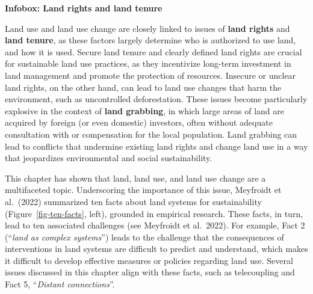 \documentclass[
  a4paper,
  openany]{book}
\begin{document}
\begin{tcolorbox}[enhanced jigsaw, left=2mm, arc=.35mm, titlerule=0mm, opacityback=0, leftrule=.75mm, title={Note}, breakable, bottomtitle=1mm, rightrule=.15mm, coltitle=black, toptitle=1mm, bottomrule=.15mm, colback=white, opacitybacktitle=0.6, colbacktitle=quarto-callout-note-color!10!white, toprule=.15mm, colframe=quarto-callout-note-color-frame]

\textbf{Infobox: Land rights and land tenure}

Land use and land use change are closely linked to issues of
\textbf{land rights} and \textbf{land tenure}, as these factors largely
determine who is authorized to use land, and how it is used. Secure land
tenure and clearly defined land rights are crucial for sustainable land
use practices, as they incentivize long-term investment in land
management and promote the protection of resources. Insecure or unclear
land rights, on the other hand, can lead to land use changes that harm
the environment, such as uncontrolled deforestation. These issues become
particularly explosive in the context of \textbf{land grabbing}, in
which large areas of land are acquired by foreign (or even domestic)
investors, often without adequate consultation with or compensation for
the local population. Land grabbing can lead to conflicts that undermine
existing land rights and change land use in a way that jeopardizes
environmental and social sustainability.

\end{tcolorbox}

This chapter has shown that land, land use, and land use change are a
multifaceted topic. Underscoring the importance of this issue, Meyfroidt
et al.~(2022) summarized ten facts about land systems for sustainability
(Figure~\ref{fig-ten-facts}, left), grounded in empirical research.
These facts, in turn, lead to ten associated challenges (see Meyfroidt
et al.~2022). For example, Fact 2 (``\emph{land as complex systems}'')
leads to the challenge that the consequences of interventions in land
systems are difficult to predict and understand, which makes it
difficult to develop effective measures or policies regarding land use.
Several issues discussed in this chapter align with these facts, such as
telecoupling and Fact 5, ``\emph{Distant connections}''.
\end{document}
